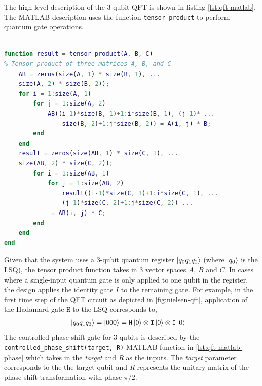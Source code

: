 The high-level description of the 3-qubit QFT is shown in listing \ref{lst:qft-matlab}. The MATLAB description uses the function \texttt{tensor\_product} to perform quantum gate operations. 
\begin{lstlisting}[language=Matlab, caption={Code snippet of the MATLAB high-level description of the 3-qubit tensor product for applying quantum gate operations in the QFT quantum circuit.}, label={lst:qft-matlab}]
% ... removed code

function result = tensor_product(A, B, C)
% Tensor product of three matrices A, B, and C
	AB = zeros(size(A, 1) * size(B, 1), ...
	size(A, 2) * size(B, 2));
	for i = 1:size(A, 1)
		for j = 1:size(A, 2)
			AB((i-1)*size(B, 1)+1:i*size(B, 1), (j-1)* ...
				size(B, 2)+1:j*size(B, 2)) = A(i, j) * B;
		end
	end
	result = zeros(size(AB, 1) * size(C, 1), ...
	size(AB, 2) * size(C, 2));
		for i = 1:size(AB, 1)
			for j = 1:size(AB, 2)
				result((i-1)*size(C, 1)+1:i*size(C, 1), ...
				(j-1)*size(C, 2)+1:j*size(C, 2)) ...
			 = AB(i, j) * C;
		end
	end
end
\end{lstlisting}
Given that the system uses a 3-qubit quantum register $\ket{q_0 q_1 q_2}$ (where $\ket{q_0}$ is the LSQ), the tensor product function takes in 3 vector spaces $A$, $B$ and $C$. In cases where a single-input quantum gate is only applied to one qubit in the register, the design applies the identity gate $I$ to the remaining gate. For example, in the first time step of the QFT circuit as depicted in \ref{fig:nielsen-qft}, application of the Hadamard gate $\texttt{H}$ to the LSQ corresponds to,
\begin{align}
	\ket{q_0 q_1 q_3} = \ket{000} & = \texttt{H}\ket{0}\otimes \texttt{I}\ket{0} \otimes \texttt{I} \ket{0}\nonumber
\end{align} 
The controlled phase shift gate for 3-qubits is described by the \texttt{controlled\_phase\_shift(target, R)} MATLAB function in \ref{lst:qft-matlab-phase} which takes in the \textit{target} and \textit{R} as the inputs. The \textit{target} parameter corresponds to the the target qubit and \textit{R} represents the unitary matrix of the phase shift transformation with phase $\pi/2$.
